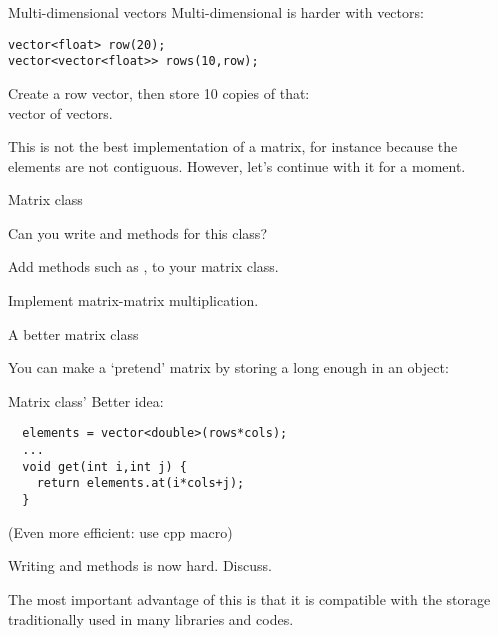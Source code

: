 \begin{block}{Multi-dimensional vectors}
  \label{sl:multi-vector}
  Multi-dimensional is harder with vectors:
\begin{lstlisting}
vector<float> row(20);
vector<vector<float>> rows(10,row);
\end{lstlisting}
Create a row vector, then store 10 copies of that:\\
vector of vectors.
\end{block}

This is not the best implementation of a matrix, for instance because
the elements are not contiguous. However, let's continue with it for a moment.

\begin{block}{Matrix class}
  \label{sl:matrix-class}
\end{block}

\begin{exercise}
  \label{ex:matrixclass-rowcol1}
  Can you write  and  methods for this class?
\end{exercise}

\begin{exercise}
  \label{ex:matrix-methods}
  Add methods such as ,  to your matrix class.

  Implement matrix-matrix multiplication.
\end{exercise}

 {A better matrix class}

You can make a `pretend' matrix by storing a long enough  in
an object:
%

\begin{slide}{Matrix class'}
  \label{sl:matrix-class-cont}
  Better idea:
\begin{lstlisting}
  elements = vector<double>(rows*cols);
  ...
  void get(int i,int j) {
    return elements.at(i*cols+j);
  }
\end{lstlisting}
(Even more efficient: use cpp macro)
\end{slide}

\begin{exercise}
  \label{ex:matrixclass-rowcol2}
  Writing  and  methods is now hard. Discuss.  
\end{exercise}

The most important advantage of this is that it is compatible with
the storage traditionally used in 
many libraries and codes.


